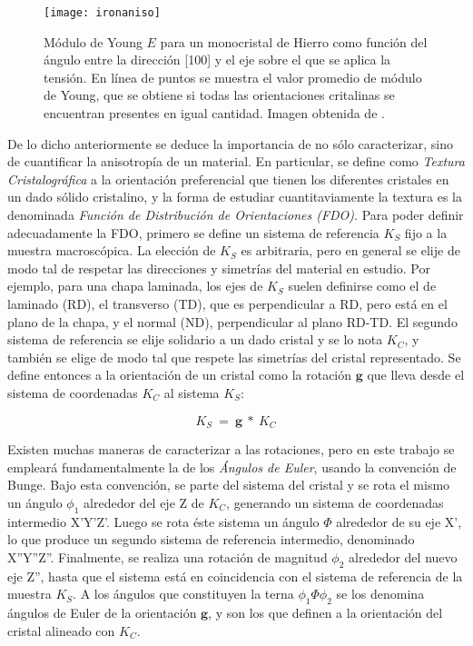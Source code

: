 \begin{figure}[!htb]
  \centering
  \texttt{[image: ironaniso]}
  \caption{Módulo de Young $E$ para un monocristal de Hierro como función del ángulo entre la dirección [100] y el eje sobre el que se aplica la tensión. En línea de puntos se muestra el valor promedio de módulo de Young, que se obtiene si todas las orientaciones critalinas se encuentran presentes en igual cantidad. Imagen obtenida de \cite{randle2000introduction}.}
  \label{fig:ironaniso}
\end{figure}

De lo dicho anteriormente se deduce la importancia de no sólo caracterizar, sino de cuantificar la anisotropía de un material. 
En particular, se define como \textit{Textura Cristalográfica} a la orientación preferencial que tienen los diferentes cristales en un dado sólido cristalino, y la forma de estudiar cuantitaviamente la textura es la denominada \textit{Función de Distribución de Orientaciones (FDO)}.
Para poder definir adecuadamente la FDO, primero se define un sistema de referencia $K_S$ fijo a la muestra macroscópica.
La elección de $K_S$ es arbitraria, pero en general se elije de modo tal de respetar las direcciones y simetrías del material en estudio. 
Por ejemplo, para una chapa laminada, los ejes de $K_S$ suelen definirse como el de laminado (RD), el transverso (TD), que es perpendicular a RD, pero está en el plano de la chapa, y el normal (ND), perpendicular al plano RD-TD.
El segundo sistema de referencia se elije solidario a un dado cristal y se lo nota $K_C$, y también se elige de modo tal que respete las simetrías del cristal representado.
Se define entonces a la orientación de un cristal como la rotación $\mathbf{g}$ que lleva desde el sistema de coordenadas $K_C$ al sistema $K_S$:

\begin{equation}
  K_S \ = \ \mathbf{g} \ * \ K_C
  \label{eq:orientation}
\end{equation}
\noindent

Existen muchas maneras de caracterizar a las rotaciones, pero en este trabajo se empleará fundamentalmente la de los \textit{Ángulos de Euler}, usando la convención de Bunge\cite{bunge2013texture}.
Bajo esta convención, se parte del sistema del cristal y se rota el mismo un ángulo $\phi_1$ alrededor del eje Z de $K_C$, generando un sistema de coordenadas intermedio X'Y'Z'.
Luego se rota éste sistema un ángulo $\Phi$ alrededor de su eje X', lo que produce un segundo sistema de referencia intermedio, denominado X''Y''Z''. Finalmente, se realiza una rotación de magnitud $\phi_2$ alrededor del nuevo eje Z'', hasta que el sistema está en coincidencia con el sistema de referencia de la muestra $K_S$.
A los ángulos que constituyen la terna $\phi_1 \Phi \phi_2$ se los denomina ángulos de Euler de la orientación $\mathbf{g}$, y son los que definen a la orientación del cristal alineado con $K_C$.

